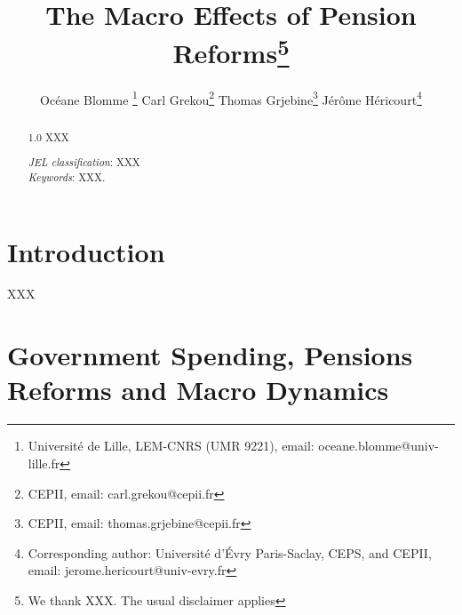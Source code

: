 \documentclass[11pt,english,a4paper, twoside, authoryear]{article}
\begin{document}
\baselineskip17pt

\title{\textbf{The Macro Effects of Pension Reforms}\thanks{We thank XXX. The usual disclaimer applies}}




\author{Océane Blomme \footnote{Universit\'{e} de Lille, LEM-CNRS (UMR 9221), email: oceane.blomme@univ-lille.fr} \quad Carl Grekou\footnote{CEPII, email: carl.grekou@cepii.fr} \quad Thomas Grjebine\footnote{CEPII, email: thomas.grjebine@cepii.fr} \quad Jérôme Héricourt\footnote{Corresponding author: Université d'Évry Paris-Saclay, CEPS, and CEPII, email: jerome.hericourt@univ-evry.fr}
}



\maketitle




\begin{abstract}

\begin{spacing}{1.0}
\noindent
XXX
\bigskip

\noindent \textit{JEL classification}: XXX \\
\bigskip \newline
\noindent \textit{Keywords}: XXX.
\end{spacing}
\end{abstract}


\thispagestyle{empty}

\newpage

\section{Introduction}


\noindent XXX

\section{Government Spending, Pensions Reforms and Macro Dynamics}
\end{document}
